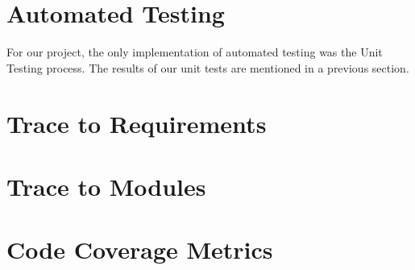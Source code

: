 \documentclass[12pt, titlepage]{article}
\begin{document}
\section{Automated Testing}
		For our project, the only implementation of automated testing was the Unit Testing process. The results of our unit tests are mentioned in a previous section.
\section{Trace to Requirements}
		
\section{Trace to Modules}		

\section{Code Coverage Metrics}




\end{document}
